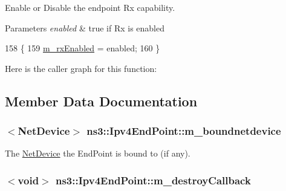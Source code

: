 Enable or Disable the endpoint Rx capability. 


\begin{DoxyParams}{Parameters}
{\em enabled} & true if Rx is enabled \\
\hline
\end{DoxyParams}

\begin{DoxyCode}
158 \{
159   \hyperlink{classns3_1_1Ipv4EndPoint_a0f0079b1a77f91505def1f7000a8c2b1}{m\_rxEnabled} = enabled;
160 \}
\end{DoxyCode}


Here is the caller graph for this function\+:




\subsection{Member Data Documentation}
\subsubsection[{\texorpdfstring{m\+\_\+boundnetdevice}{m_boundnetdevice}}]{$<${\bf Net\+Device}$>$ ns3\+::\+Ipv4\+End\+Point\+::m\+\_\+boundnetdevice\hspace{0.3cm}{\ttfamily [private]}}\hypertarget{classns3_1_1Ipv4EndPoint_a933ecf471a5da3f4e69dfa649d536286}{}\label{classns3_1_1Ipv4EndPoint_a933ecf471a5da3f4e69dfa649d536286}


The \hyperlink{classns3_1_1NetDevice}{Net\+Device} the End\+Point is bound to (if any). 

\subsubsection[{\texorpdfstring{m\+\_\+destroy\+Callback}{m_destroyCallback}}]{$<$void$>$ ns3\+::\+Ipv4\+End\+Point\+::m\+\_\+destroy\+Callback\hspace{0.3cm}{\ttfamily [private]}}\hypertarget{classns3_1_1Ipv4EndPoint_ad3e21ec6619dfb4e8a9ccfb696c1d020}{}\label{classns3_1_1Ipv4EndPoint_ad3e21ec6619dfb4e8a9ccfb696c1d020}



